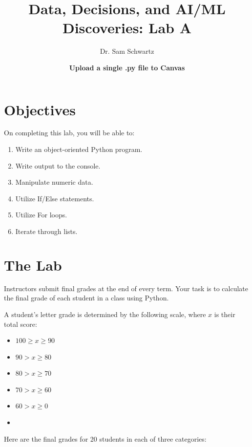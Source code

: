 \documentclass{article}
\title{Data, Decisions, and AI/ML Discoveries: Lab A}
\date{\textbf{Upload a single .py file to Canvas}}
\author{Dr. Sam Schwartz}
\begin{document}
	
	\maketitle
	
	

\section{Objectives}
On completing this lab, you will be able to:

\begin{enumerate}
	\item Write an object-oriented Python program.
	\item Write output to the console.
	\item Manipulate numeric data.
	\item Utilize If/Else statements.
	\item Utilize For loops.
	\item Iterate through lists.
\end{enumerate}

\section{The Lab}

Instructors submit final grades at the end of every term. Your task is to calculate the final grade of each student in a class using Python.

A student's letter grade is determined by the following scale, where $x$ is their total score:
\begin{itemize}
	\setlength\itemsep{0em}
	\item[A] $100\ge x \ge 90$
	\item[B] $90> x \ge 80$
	\item[C] $80> x \ge 70$
	\item[D] $70> x \ge 60$
	\item[F] $60> x \ge 0$
	\item[]
\end{itemize}


Here are the final grades for 20 students in each of three categories:
\end{document}
